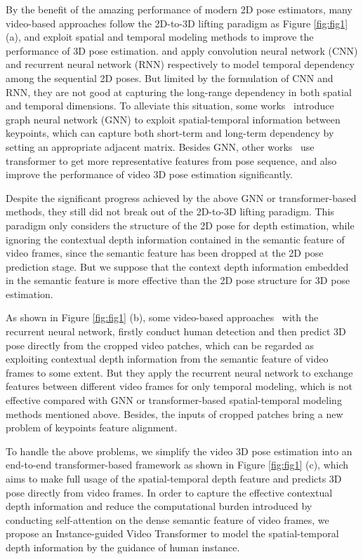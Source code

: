 \documentclass[sigconf]{acmart}
\begin{document}
By the benefit of the amazing performance of modern 2D pose estimators, many video-based approaches follow the 2D-to-3D lifting paradigm as Figure \ref{fig:fig1} (a), and exploit spatial and temporal modeling methods to improve the performance of 3D pose estimation. 
\cite{liu2020attention} and \cite{hossain2018exploiting} apply convolution neural network (CNN) and recurrent neural network (RNN) respectively to model temporal dependency among the sequential 2D poses. 
But limited by the formulation of CNN and RNN, they are not good at capturing the long-range dependency in both spatial and temporal dimensions. 
To alleviate this situation, some works~\cite{cai2019exploiting,wang2020motion,cheng20203d} introduce graph neural network (GNN) to exploit spatial-temporal information between keypoints, which can capture both short-term and long-term dependency by setting an appropriate adjacent matrix. Besides GNN, other works~\cite{lin2021end,zheng20213d} use transformer to get more representative features from pose sequence, and also improve the performance of video 3D pose estimation significantly.



Despite the significant progress achieved by the above GNN or transformer-based methods, they still did not break out of the 2D-to-3D lifting paradigm. This paradigm only considers the structure of the 2D pose for depth estimation, while ignoring the contextual depth information contained in the semantic feature of video frames, since the semantic feature has been dropped at the 2D pose prediction stage. But we suppose that the context depth information embedded in the semantic feature is more effective than the 2D pose structure for 3D pose estimation.

As shown in Figure \ref{fig:fig1} (b), some video-based approaches~\cite{sun2019human,choi2021beyond} with the recurrent neural network, firstly conduct human detection and then predict 3D pose directly from the cropped video patches, which can be regarded as exploiting contextual depth information from the semantic feature of video frames to some extent. But they apply the recurrent neural network to exchange features between different video frames for only temporal modeling, which is not effective compared with GNN or transformer-based spatial-temporal modeling methods mentioned above. Besides, the inputs of cropped patches bring a new problem of keypoints feature alignment.

To handle the above problems, we simplify the video 3D pose estimation into an end-to-end transformer-based framework as shown in Figure \ref{fig:fig1} (c), which aims to make full usage of the spatial-temporal depth feature and predicts 3D pose directly from video frames. In order to capture the effective contextual depth information and reduce the computational burden introduced by conducting self-attention on the dense semantic feature of video frames, we propose an Instance-guided Video Transformer to model the spatial-temporal depth information by the guidance of human instance. 
\end{document}
